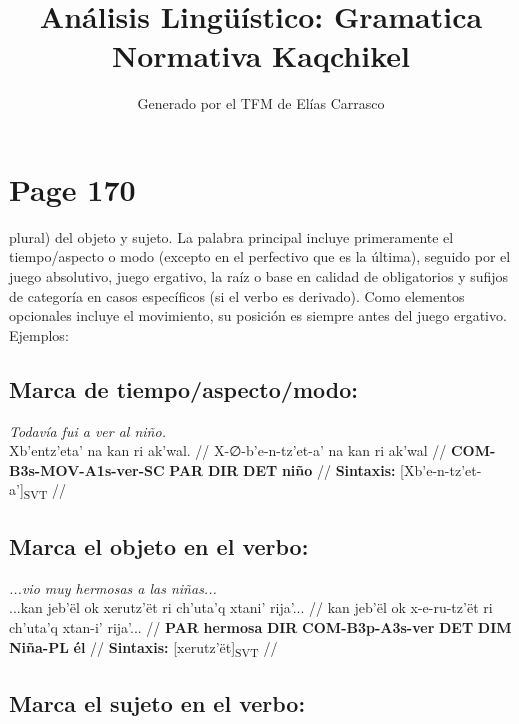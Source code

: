 \documentclass{article}%
\title{Análisis Lingüístico: Gramatica Normativa Kaqchikel}%
\author{Generado por el TFM de Elías Carrasco}%
\begin{document}
%
\normalsize%
\maketitle%
\section{Page 170}%
\label{sec:Page170}%
plural) del objeto y sujeto. La palabra principal incluye primeramente el tiempo/aspecto %
o modo (excepto en el perfectivo que es la última), seguido por el juego absolutivo, %
juego ergativo, la raíz o base en calidad de obligatorios y sufijos de categoría en casos %
específicos (si el verbo es derivado). Como elementos opcionales incluye el movimiento, %
su posición es siempre antes del juego ergativo. Ejemplos: %
\subsection{Marca de tiempo/aspecto/modo:}%
\label{subsec:Marcadetiempo/aspecto/modo}%

%
\par\medskip%
\ex
\textit{Todavía fui a ver al niño.} \\
\begingl
\gla Xb'entz'eta' na kan ri ak'wal. //
\glb X-∅-b'e-n-tz'et-a' na kan ri ak'wal //
\glc \textbf{COM-}\textbf{B3s-}\textbf{MOV-}\textbf{A1s-}\textbf{ver-}\textbf{SC} \textbf{PAR} \textbf{DIR} \textbf{DET} \textbf{niño} //
\glft \textbf{Sintaxis:} [Xb'e-n-tz'et-a']\textsubscript{SVT} //
\endgl
\xe
%
\medskip%
\subsection{Marca el objeto en el verbo:}%
\label{subsec:Marcaelobjetoenelverbo}%

%
\par\medskip%
\ex
\textit{...vio muy hermosas a las niñas...} \\
\begingl
\gla ...kan jeb'ël ok xerutz'ët ri ch'uta'q xtani' rija'... //
\glb kan jeb'ël ok x-e-ru-tz'ët ri ch'uta'q xtan-i' rija'... //
\glc \textbf{PAR} \textbf{hermosa} \textbf{DIR} \textbf{COM-}\textbf{B3p-}\textbf{A3s-}\textbf{ver} \textbf{DET} \textbf{DIM} \textbf{Niña-PL} \textbf{él} //
\glft \textbf{Sintaxis:} [xerutz'ët]\textsubscript{SVT} //
\endgl
\xe
%
\medskip%
\subsection{Marca el sujeto en el verbo:}%
\label{subsec:Marcaelsujetoenelverbo}%
\end{document}
